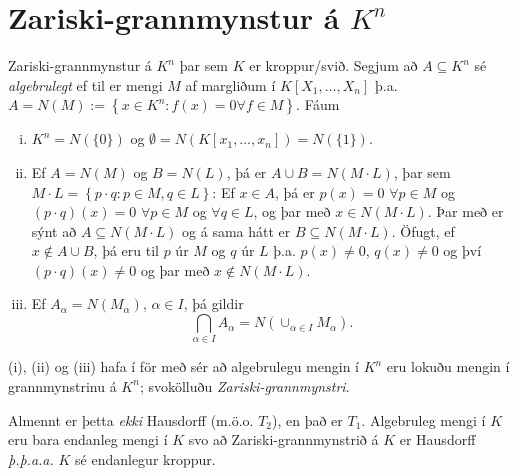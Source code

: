 \documentclass[a4paper,icelandic]{book}
\theoremstyle{definition}
\theoremstyle{plain}
\theoremstyle{remark}
\begin{document}
\section{Zariski-grannmynstur á $K^n$}
Zariski-grannmynstur á $K^n$ þar sem $K$ er kroppur/svið. Segjum að
$A\subseteq K^n$ sé \emph{algebrulegt}
ef til er mengi $M$ af margliðum í $K[X_1,\dots,X_n]$ þ.a. $A=N(M)
:=\left\{ x\in K^n : f(x) = 0\forall f\in M \right\}$. Fáum
\begin{enumerate}[(i)]
  \item $K^n = N(\{0\})$ og $\emptyset = N(K\left[ x_1,\dots,x_n
    \right]) = N(\{1\})$.
  \item Ef $A = N(M)$ og $B = N(L)$, þá er $A\cup B = N(M\cdot L)$, þar
    sem $M\cdot L = \left\{ p\cdot q:p\in M,q\in L \right\}$:  Ef $x\in
    A$, þá er $p(x) = 0$ $\forall p\in M$ og $(p\cdot q)(x) = 0$
    $\forall p\in M$ og $\forall q\in L$, og þar með $x\in N(M\cdot L)$.
    Þar með er sýnt að $A\subseteq N(M\cdot L)$ og á sama hátt er
    $B\subseteq N(M\cdot L)$. Öfugt, ef $x\notin A\cup B$, þá eru til
    $p$ úr $M$ og $q$ úr $L$ þ.a. $p(x)\neq 0$, $q(x)\neq 0$ og því
    $(p\cdot q)(x)\neq 0$ og þar með $x\notin N(M\cdot L)$.
  \item Ef $A_\alpha = N(M_\alpha)$, $\alpha\in I$, þá gildir \[
    \bigcap_{\alpha\in I} A_\alpha
    = N\left( \cup_{\alpha\in I} M_\alpha \right).
    \]
\end{enumerate}
(i), (ii) og (iii) hafa í för með sér að algebrulegu mengin í $K^n$ eru
lokuðu mengin í grannmynstrinu á $K^n$; svokölluðu
\emph{Zariski-grannmynstri}. 

Almennt er þetta \emph{ekki} Hausdorff (m.ö.o. $T_2$), en það er $T_1$.
Algebruleg mengi í $K$ eru bara endanleg mengi í $K$ svo að
Zariski-grannmynstrið á $K$ er Hausdorff \emph{þ.þ.a.a.} $K$ sé
endanlegur kroppur.
\end{document}
